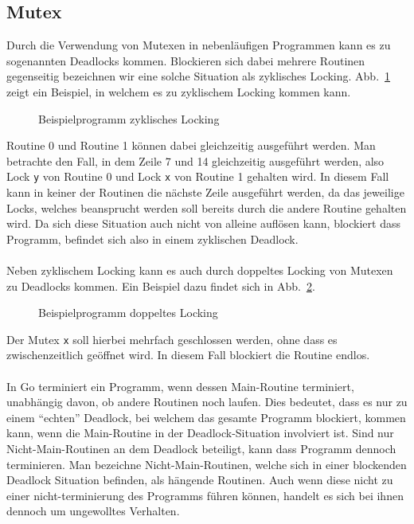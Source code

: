 \subsection{Mutex}\label{Chap:Back-Sec:Prob-SubSec:Mutex}
Durch die Verwendung von Mutexen in nebenläufigen Programmen kann es 
zu sogenannten Deadlocks kommen. Blockieren sich dabei mehrere Routinen 
gegenseitig bezeichnen wir eine solche Situation als zyklisches Locking.
Abb.~\ref{Chap:Analyze-Sec:Mutex-Fig:Zyclic} zeigt ein Beispiel, in welchem es zu zyklischem 
Locking kommen kann.
\begin{figure}[h!]
  
  \caption{Beispielprogramm zyklisches Locking}
  \label{Chap:Analyze-Sec:Mutex-Fig:Zyclic}
\end{figure}
Routine 0 und Routine 1 können dabei gleichzeitig ausgeführt werden. Man betrachte den Fall, in dem 
Zeile 7 und 14 gleichzeitig ausgeführt werden, also Lock \texttt{y} von Routine 0 und Lock \texttt{x} 
von Routine 1 gehalten wird. In diesem Fall kann in keiner der Routinen die nächste Zeile ausgeführt werden,
da das jeweilige Locks, welches beansprucht werden soll bereits durch die andere Routine gehalten wird. 
Da sich diese Situation auch nicht von alleine auflösen kann, blockiert dass Programm, befindet sich also 
in einem zyklischen Deadlock.\\\\
Neben zyklischem Locking kann es auch durch doppeltes Locking von Mutexen 
zu Deadlocks kommen. Ein Beispiel dazu findet sich in 
Abb.~\ref{Chap:Analyze-Sec:Mutex-Fig:Double}.
\begin{figure}[h!]
  
  \caption{Beispielprogramm doppeltes Locking}
  \label{Chap:Analyze-Sec:Mutex-Fig:Double}
\end{figure}
Der Mutex \texttt{x} soll hierbei mehrfach geschlossen werden, ohne dass 
es zwischenzeitlich geöffnet wird. In diesem Fall blockiert die Routine
endlos.\\\\
In Go terminiert ein Programm, wenn dessen Main-Routine terminiert, unabhängig
davon, ob andere Routinen noch laufen. Dies bedeutet, dass es nur zu einem 
``echten'' Deadlock, bei welchem das gesamte Programm blockiert, kommen kann,
wenn die Main-Routine in der Deadlock-Situation involviert ist. Sind nur 
Nicht-Main-Routinen an dem Deadlock beteiligt, kann dass Programm dennoch
terminieren. Man bezeichne Nicht-Main-Routinen, welche sich in einer blockenden 
Deadlock Situation befinden, als hängende Routinen. Auch wenn diese nicht zu einer 
nicht-terminierung des Programms führen können, handelt es sich bei ihnen dennoch 
um ungewolltes Verhalten.

